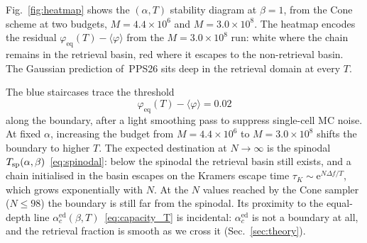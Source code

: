\documentclass[letterpaper]{article} %
\newcommand{\avg}[1]{\langle #1 \rangle}
\newcommand{\e}{{\mathrm{e}}}
\newcommand{\Bnet}{\beta}
\newcommand{\acEd}{\alpha_c^{\mathrm{ed}}}
\begin{document}

Fig.~\ref{fig:heatmap} shows the $(\alpha, T)$ stability diagram at $\Bnet = 1$, from the Cone scheme at two budgets, $M = 4.4 \times 10^6$ and $M = 3.0 \times 10^8$. The heatmap encodes the residual $\varphi_{\mathrm{eq}}(T) - \langle\varphi\rangle$ from the $M = 3.0 \times 10^8$ run: white where the chain remains in the retrieval basin, red where it escapes to the non-retrieval basin. The Gaussian prediction of~PPS26 sits deep in the retrieval domain at every $T$.

The blue staircases trace the threshold
\begin{equation}
    \varphi_{\mathrm{eq}}(T) - \langle\varphi\rangle = 0.02
    \label{eq:threshold}
\end{equation}
along the boundary, after a light smoothing pass to suppress single-cell MC noise.
At fixed $\alpha$, increasing the budget from $M = 4.4 \times 10^6$ to $M = 3.0 \times 10^8$ shifts the boundary to higher $T$. The expected destination at $N \to \infty$ is the spinodal $T_{\rm sp}(\alpha, \Bnet)$~\eqref{eq:spinodal}: below the spinodal the retrieval basin still exists, and a chain initialised in the basin escapes on the Kramers escape time $\tau_K \sim \e^{N \Delta f / T}$, which grows exponentially with $N$. At the $N$ values reached by the Cone sampler ($N \leq 98$) the boundary is still far from the spinodal. Its proximity to the equal-depth line $\acEd(\Bnet, T)$~\eqref{eq:capacity_T} is incidental: $\acEd$ is not a boundary at all, and the retrieval fraction is smooth as we cross it (Sec.~\ref{sec:theory}). 

\end{document}
